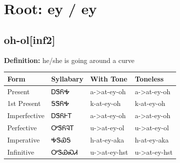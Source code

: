 \documentclass{article}%
\begin{document}
%
\normalsize%
\section*{Root: ey / ey}%
\subsection*{oh-ol[inf2]}%
\textbf{Definition: }%
he/she is going around a curve%
\\[0.5em]%
\begin{tabular}{|l|l|l|l|}%
\hline%
\textbf{Form}&\textbf{Syllabary}&\textbf{With Tone}&\textbf{Toneless}\\%
\hline%
Present&ᎠᏕᏲᎭ&a{-}>at{-}ey{-}oh&a{-}>at{-}ey{-}oh\\%
1st Present&ᎦᏕᏲᎭ&k{-}at{-}ey{-}oh&k{-}at{-}ey{-}oh\\%
Imperfective&ᎠᏕᏲᎰᎢ&a{-}>at{-}ey{-}oh&a{-}>at{-}ey{-}oh\\%
Perfective&ᎤᏕᏲᎸᎢ&u{-}>at{-}ey{-}ol&u{-}>at{-}ey{-}ol\\%
Imperative&ᎭᏕᏯᎦ&h{-}at{-}ey{-}aka&h{-}at{-}ey{-}aka\\%
Infinitive&ᎤᏕᏯᏍᏗ&u{-}>at{-}ey{-}hst&u{-}>at{-}ey{-}hst\\%
\hline%
\end{tabular}%
\\[1em]%
\end{document}
